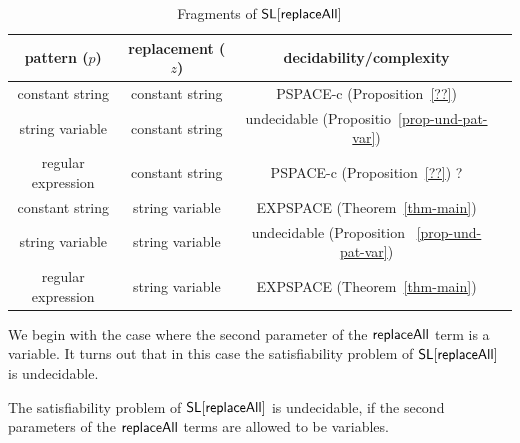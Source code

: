 \begin{table}[htbp]
\begin{tabular}{|c|c|c|c}
\hline
pattern ($p$)  &   replacement ($z$)        & decidability/complexity \\
\hline
constant string  &   constant   string                    & PSPACE-c (Proposition~\ref{??})    \\
\hline
string variable &   constant   string                    &  undecidable (Propositio~\ref{prop-und-pat-var})    \\
\hline
regular expression  &   constant string                      &    PSPACE-c (Proposition~\ref{??}) ?     \\

\hline
constant string  &   string variable                       & EXPSPACE (Theorem~\ref{thm-main})       \\

\hline
string variable  &   string variable                       & undecidable   (Proposition ~\ref{prop-und-pat-var})   \\

\hline
regular expression  &   string variable                       &      EXPSPACE (Theorem~\ref{thm-main})      \\
\hline
\end{tabular}
\caption{Fragments of $\mathsf{SL}[\mathsf{replaceAll}]$}\label{tab-sum}
\end{table}

We begin with the case where the second parameter of the $\mathsf{replaceAll}$ term is a variable. It turns out that in this case the satisfiability problem of $\mathsf{SL}[\mathsf{replaceAll}]$ is undecidable.

\begin{proposition}\label{prop-und-pat-var}
The satisfiability problem of $\mathsf{SL}[\mathsf{replaceAll}]$ is undecidable, if the second parameters of the $\mathsf{replaceAll}$ terms are allowed to be variables.
\end{proposition}

